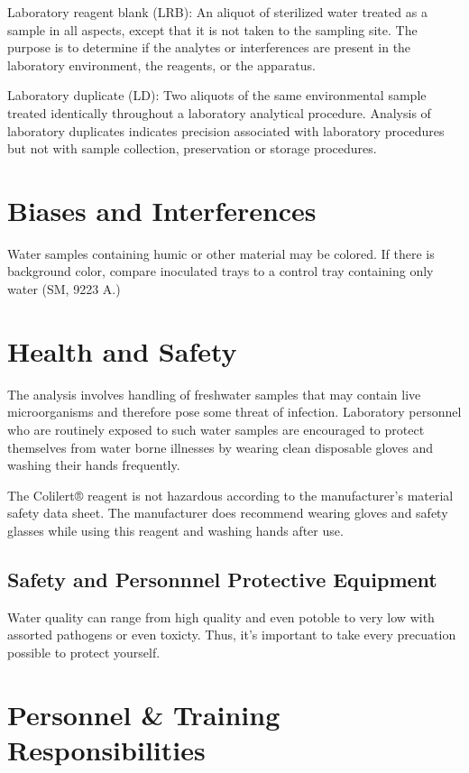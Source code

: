 \documentclass[12pt]{../SOP4_alpha}\usepackage[]{graphicx}\usepackage[]{xcolor}
\begin{document}
\NP Laboratory reagent blank (LRB): An aliquot of sterilized water treated as a
sample in all aspects, except that it is not taken to the sampling site. The
purpose is to determine if the analytes or interferences are present in the
laboratory environment, the reagents, or the apparatus.

\NP Laboratory duplicate (LD): Two aliquots of the same environmental sample
treated identically throughout a laboratory analytical procedure. Analysis
of laboratory duplicates indicates precision associated with laboratory
procedures but not with sample collection, preservation or storage
procedures. 


\section{Biases and Interferences}
\NP Water samples containing humic or other material may be colored. If there is
background color, compare inoculated trays to a control tray containing only
water (SM, 9223 A.) 

\section{Health and Safety}

\NP The analysis involves handling of freshwater samples that may contain live
microorganisms and therefore pose some threat of infection. Laboratory personnel
who are routinely exposed to such water samples are encouraged to protect
themselves from water borne illnesses by wearing clean disposable gloves and
washing their hands frequently.

\NP The Colilert® reagent is not hazardous according to the manufacturer’s material
safety data sheet. The manufacturer does recommend wearing gloves and safety
glasses while using this reagent and washing hands after use. 


\subsection{Safety and Personnnel Protective Equipment}

Water quality can range from high quality and even potoble to very low with assorted pathogens or even toxicty. Thus, it's important to take every precuation possible to protect yourself. 

\section{Personnel \& Training Responsibilities}
\end{document}
